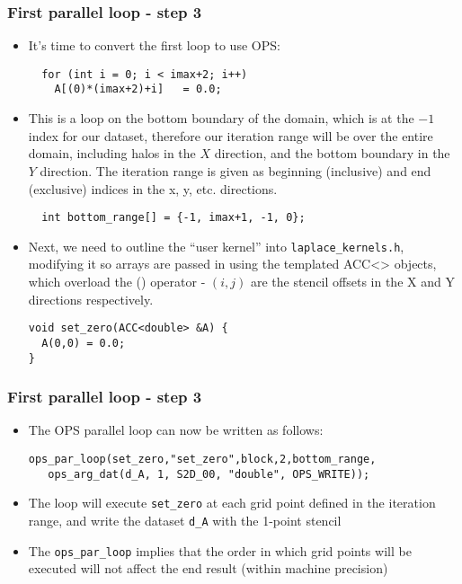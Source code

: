 \documentclass{beamer}
\begin{document}
\begin{frame}[fragile]
\frametitle{First parallel loop - step 3}
\begin{itemize}
\item It's time to convert the first loop to use OPS:
\begin{lstlisting}
  for (int i = 0; i < imax+2; i++)
    A[(0)*(imax+2)+i]   = 0.0;
\end{lstlisting}
  \item This is a loop on the bottom boundary of the domain, which is at the $-1$ index for our dataset, therefore our iteration range will be over the entire domain, including halos in the $X$ direction, and the bottom boundary in the $Y$ direction. The iteration range is given as beginning (inclusive) and end (exclusive) indices in the x, y, etc. directions.
  \begin{lstlisting}
  int bottom_range[] = {-1, imax+1, -1, 0};
\end{lstlisting}
\item Next, we need to outline the ``user kernel'' into \texttt{laplace\_kernels.h}, modifying it so arrays are passed in using the templated ACC<> objects, which overload the () operator - $(i,j)$ are the stencil offsets in the X and Y directions respectively.
\begin{lstlisting}
void set_zero(ACC<double> &A) {
  A(0,0) = 0.0;
}
\end{lstlisting}
\end{itemize}
\end{frame}

\begin{frame}[fragile]
\frametitle{First parallel loop - step 3}
\begin{itemize}
\item The OPS parallel loop can now be written as follows:
\begin{lstlisting}
ops_par_loop(set_zero,"set_zero",block,2,bottom_range,
   ops_arg_dat(d_A, 1, S2D_00, "double", OPS_WRITE));
\end{lstlisting}  
  \item The loop will execute \texttt{set\_zero} at each grid point defined in the iteration range, and write the dataset \texttt{d\_A} with the 1-point stencil
  \item The \texttt{ops\_par\_loop} implies that the order in which grid points will be executed will not affect the end result (within machine precision)
\end{itemize}
\end{frame}
\end{document}
